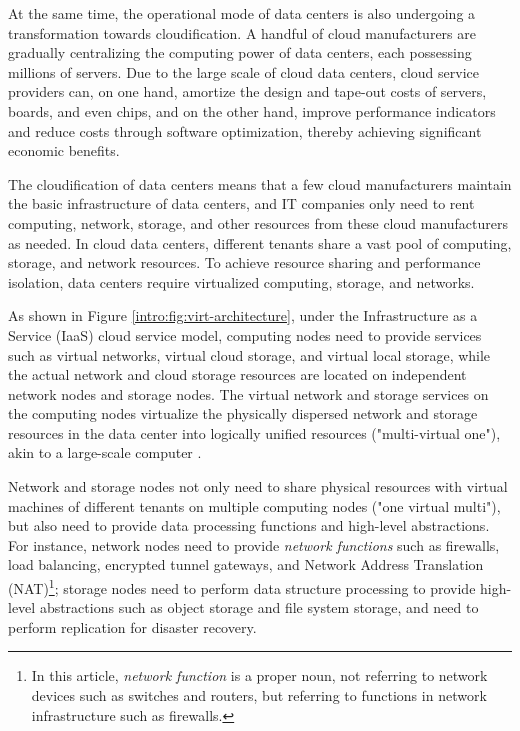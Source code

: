 At the same time, the operational mode of data centers is also undergoing a transformation towards cloudification. A handful of cloud manufacturers are gradually centralizing the computing power of data centers, each possessing millions of servers. Due to the large scale of cloud data centers, cloud service providers can, on one hand, amortize the design and tape-out costs of servers, boards, and even chips, and on the other hand, improve performance indicators and reduce costs through software optimization, thereby achieving significant economic benefits. 

The cloudification of data centers means that a few cloud manufacturers maintain the basic infrastructure of data centers, and IT companies only need to rent computing, network, storage, and other resources from these cloud manufacturers as needed. In cloud data centers, different tenants share a vast pool of computing, storage, and network resources. To achieve resource sharing and performance isolation, data centers require virtualized computing, storage, and networks. 

As shown in Figure \ref{intro:fig:virt-architecture}, under the Infrastructure as a Service (IaaS) cloud service model, computing nodes need to provide services such as virtual networks, virtual cloud storage, and virtual local storage, while the actual network and cloud storage resources are located on independent network nodes and storage nodes. The virtual network and storage services on the computing nodes virtualize the physically dispersed network and storage resources in the data center into logically unified resources ("multi-virtual one"), akin to a large-scale computer \cite{barroso2018datacenter}. 

Network and storage nodes not only need to share physical resources with virtual machines of different tenants on multiple computing nodes ("one virtual multi"), but also need to provide data processing functions and high-level abstractions. For instance, network nodes need to provide \textit{network functions} such as firewalls, load balancing, encrypted tunnel gateways, and Network Address Translation (NAT)\footnote{In this article, \textit{network function} is a proper noun, not referring to network devices such as switches and routers, but referring to functions in network infrastructure such as firewalls.}; storage nodes need to perform data structure processing to provide high-level abstractions such as object storage and file system storage, and need to perform replication for disaster recovery.

